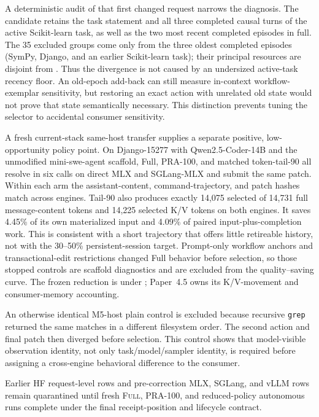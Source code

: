 \documentclass[11pt]{article}
\begin{document}
A deterministic audit of that first changed request narrows the diagnosis.
The candidate retains the task statement and all three completed causal turns
of the active Scikit-learn task, as well as the two most recent completed
episodes in full.  The 35 excluded groups come only from the three oldest
completed episodes (SymPy, Django, and an earlier Scikit-learn task); their
principal resources are disjoint from
.  Thus the divergence is not caused
by an undersized active-task recency floor.  An old-epoch add-back can still
measure in-context workflow-exemplar sensitivity, but restoring an exact
action with unrelated old state would not prove that state semantically
necessary.  This distinction prevents tuning the selector to accidental
consumer sensitivity.

A fresh current-stack same-host transfer supplies a separate positive,
low-opportunity policy point.  On Django-15277 with Qwen2.5-Coder-14B and the
unmodified mini-swe-agent scaffold, Full, PRA-100, and matched token-tail-90
all resolve in six calls on direct MLX and SGLang-MLX and submit the same patch.
Within each arm the assistant-content, command-trajectory, and patch hashes
match across engines.  Tail-90 also produces exactly 14,075 selected of 14,731
full message-content tokens and 14,225 selected K/V tokens on both engines.  It
saves 4.45\% of its own materialized input and 4.09\% of paired
input-plus-completion work.  This is
consistent with a short trajectory that offers little retireable history, not
with the 30--50\% persistent-session target.  Prompt-only workflow anchors
and transactional-edit restrictions changed Full behavior before selection,
so those stopped controls are scaffold diagnostics and are excluded from the
quality--saving curve.  The frozen reduction is under
;
Paper~4.5 owns its K/V-movement and consumer-memory accounting.

An otherwise identical M5-host plain control is excluded because recursive
\texttt{grep} returned the same matches in a different filesystem order.  The
second action and final patch then diverged before selection.  This control
shows that model-visible observation identity, not only task/model/sampler
identity, is required before assigning a cross-engine behavioral difference to
the consumer.

Earlier HF request-level rows and pre-correction MLX, SGLang, and vLLM rows
remain quarantined until fresh \textsc{Full}, PRA-100, and reduced-policy
autonomous runs complete under the final receipt-position and lifecycle
contract.
\end{document}

